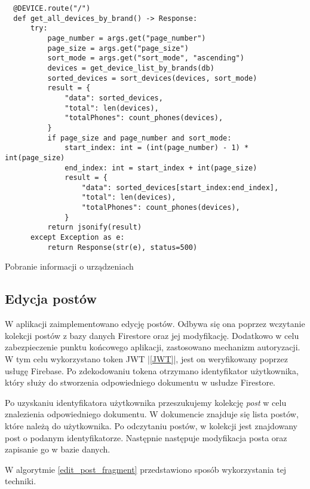 \begin{code}[H]
  \begin{verbatim}
  @DEVICE.route("/")
  def get_all_devices_by_brand() -> Response:
      try:
          page_number = args.get("page_number")
          page_size = args.get("page_size")
          sort_mode = args.get("sort_mode", "ascending")
          devices = get_device_list_by_brands(db)
          sorted_devices = sort_devices(devices, sort_mode)
          result = {
              "data": sorted_devices,
              "total": len(devices),
              "totalPhones": count_phones(devices),
          }
          if page_size and page_number and sort_mode:
              start_index: int = (int(page_number) - 1) * int(page_size)
              end_index: int = start_index + int(page_size)
              result = {
                  "data": sorted_devices[start_index:end_index],
                  "total": len(devices),
                  "totalPhones": count_phones(devices),
              }
          return jsonify(result)
      except Exception as e:
          return Response(str(e), status=500)    
  \end{verbatim}
  \centering
  \caption{Pobranie informacji o urządzeniach}
  \label{slice_example}
\end{code}

\subsection{Edycja postów}
W aplikacji zaimplementowano edycję postów. Odbywa się ona poprzez wczytanie kolekcji postów z bazy danych Firestore \cite{firestore} oraz jej modyfikację. Dodatkowo w celu zabezpieczenie punktu końcowego aplikacji, zastosowano mechanizm autoryzacji. W tym celu wykorzystano token JWT |\ref{JWT}|, jest on weryfikowany poprzez usługę Firebase. Po zdekodowaniu tokena otrzymano identyfikator użytkownika, który służy do stworzenia odpowiedniego dokumentu w usłudze Firestore. 

Po uzyskaniu identyfikatora użytkownika przeszukujemy kolekcję \textit{post} w celu znalezienia odpowiedniego dokumentu. W dokumencie znajduje się lista postów, które należą do użytkownika. Po odczytaniu postów, w kolekcji jest znajdowany post o podanym identyfikatorze. Następnie następuje modyfikacja posta oraz zapisanie go w bazie danych.

W algorytmie \ref{edit_post_fragment} przedstawiono sposób wykorzystania tej techniki.

